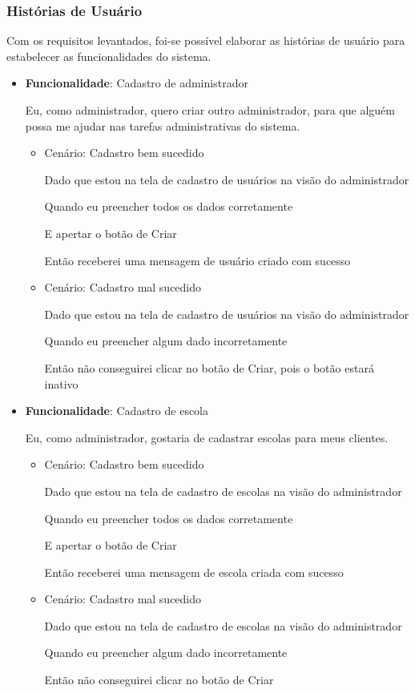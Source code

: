 \subsubsection{Histórias de Usuário}
Com os requisitos levantados, foi-se possível elaborar as histórias de usuário para estabelecer as funcionalidades do sistema. 

\begin{itemize}
    \item\textbf{Funcionalidade}: Cadastro de administrador
    
    Eu, como administrador, quero criar outro administrador, para que alguém possa me ajudar nas tarefas administrativas do sistema.
    \begin{itemize}
        \item Cenário: Cadastro bem sucedido  
        \par Dado que estou na tela de cadastro de usuários na visão do administrador
        \par Quando eu preencher todos os dados corretamente
        \par E apertar o botão de Criar
        \par Então receberei uma mensagem de usuário criado com sucesso
    \end{itemize}   
    \begin{itemize}
        \item Cenário: Cadastro mal sucedido  
        \par Dado que estou na tela de cadastro de usuários na visão do administrador
        \par Quando eu preencher algum dado incorretamente
        \par Então não conseguirei clicar no botão de Criar, pois o botão estará inativo
    \end{itemize}       

\item\textbf{Funcionalidade}: Cadastro de escola
    
    Eu, como administrador, gostaria de cadastrar escolas para meus clientes.
    \begin{itemize}
        \item Cenário: Cadastro bem sucedido  
        \par Dado que estou na tela de cadastro de escolas na visão do administrador
        \par Quando eu preencher todos os dados corretamente
        \par E apertar o botão de Criar
        \par Então receberei uma mensagem de escola criada com sucesso
    \end{itemize}   
    \begin{itemize}
        \item Cenário: Cadastro mal sucedido  
        \par Dado que estou na tela de cadastro de escolas na visão do administrador
        \par Quando eu preencher algum dado incorretamente
        \par Então não conseguirei clicar no botão de Criar
    \end{itemize}    


\end{itemize}
